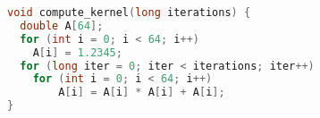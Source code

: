 \begin{lstlisting}[language=C,caption={Excerpt from compute kernel implementation.\label{lst:compute-kernel}},float]
void compute_kernel(long iterations) {
  double A[64];
  for (int i = 0; i < 64; i++)
    A[i] = 1.2345;
  for (long iter = 0; iter < iterations; iter++)
    for (int i = 0; i < 64; i++)
        A[i] = A[i] * A[i] + A[i];
}
\end{lstlisting}
